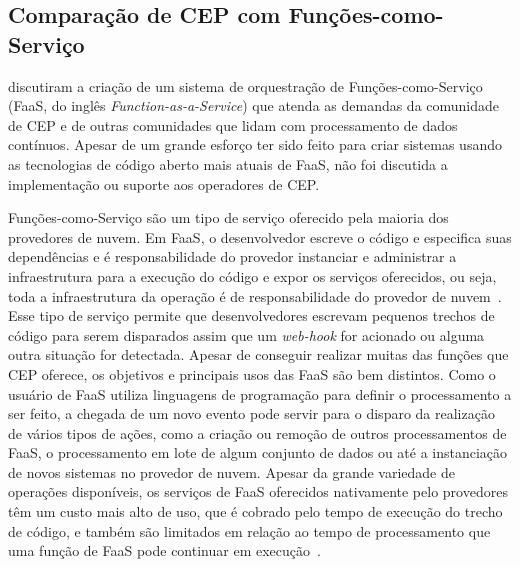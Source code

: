 
\subsection{Comparação de CEP com Funções-como-Serviço}
\label{sub-sec:Faas}

\cite{10.1145/3401025.3401731} discutiram a criação de um sistema de orquestração de Funções-como-Serviço (FaaS, do inglês \textit{Function-as-a-Service}) que atenda as demandas da comunidade de CEP e de outras comunidades que lidam com processamento de dados contínuos. Apesar de um grande esforço ter sido feito para criar sistemas usando as tecnologias de código aberto mais atuais de FaaS, não foi discutida a implementação ou suporte aos operadores de CEP. %

Funções-como-Serviço são um tipo de serviço oferecido pela maioria dos provedores de nuvem. Em FaaS, o desenvolvedor escreve o código e especifica suas dependências e é responsabilidade do provedor instanciar e administrar a infraestrutura para a execução do código e expor os serviços oferecidos, ou seja, toda a infraestrutura da operação é de responsabilidade do provedor de nuvem~\citep{garrison2017cloud}. Esse tipo de serviço permite que desenvolvedores escrevam pequenos trechos de código para serem disparados assim que um \textit{web-hook} for acionado ou alguma outra situação for detectada. Apesar de conseguir realizar muitas das funções que CEP oferece, os objetivos e principais usos das FaaS são bem distintos. Como o usuário de FaaS utiliza linguagens de programação para definir o processamento a ser feito, a chegada de um novo evento pode servir para o disparo da realização de vários tipos de ações, como a criação ou remoção de outros processamentos de FaaS, o processamento em lote de algum conjunto de dados ou até a instanciação de novos sistemas no provedor de nuvem. Apesar da grande variedade de operações disponíveis, os serviços de FaaS oferecidos nativamente pelo provedores têm um custo mais alto de uso, que é cobrado pelo tempo de execução do trecho de código, e também são limitados em relação ao tempo de processamento que uma função de FaaS pode continuar em execução~\citep{AWSLambda,AzureCloudServices,GoogleAppEngine}.

